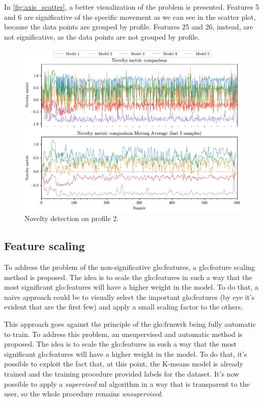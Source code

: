 In \autoref{fig:axis_scatter}, a better visualization of the problem is presented. Features 5 and 6 are significative of the specific movement as we can see in the scatter plot, because the data points are grouped by profile. Features 25 and 26, instead, are not significative, as the data points are not grouped by profile.



\begin{figure}
    \centering
    \includegraphics[angle=-90,origin=c]{images/LinearMotor/Testing.pdf}
    \caption{Novelty detection on profile 2.}
    \label{fig:axis_testing}
\end{figure}
\clearpage


\subsection{Feature scaling}
To address the problem of the non-significative \gls{glo:feature}s, a \gls{glo:feature} scaling method is proposed. The idea is to scale the \gls{glo:feature}s in such a way that the most significant \gls{glo:feature}s will have a higher weight in the model. To do that, a naive approach could be to visually select the important \gls{glo:feature}s (by eye it's evident that are the first few) and apply a small scaling factor to the others. 

This approach goes against the principle of the \gls{glo:frmwrk} being fully automatic to train. To address this problem, an unsupervised and automatic method is proposed. The idea is to scale the \gls{glo:feature}s in such a way that the most significant \gls{glo:feature}s will have a higher weight in the model. To do that, it's possible to exploit the fact that, at this point, the K-means model is already trained and the training procedure provided labels for the dataset. It's now possible to apply a \emph{supervised} \gls{ml} algorithm in a way that is transparent to the user, so the whole procedure remains \emph{unsupervised}.

